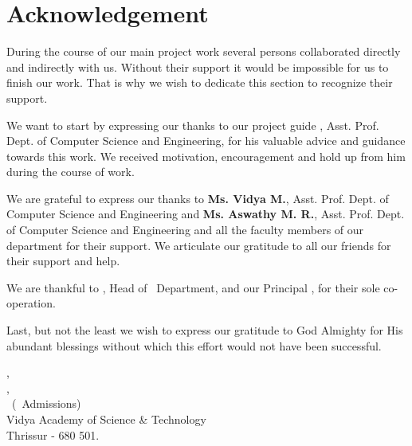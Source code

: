 %
%
%


%
\chapter*{\centering Acknowledgement}
%


\par
\hspace{0.9cm}During the course of our main project work several persons collaborated directly and indirectly with us. Without their support it would be impossible for us to finish our work. That is why we wish to dedicate this section to recognize their support.
\vspace {.2cm}
\par
\hspace{.35cm}We want to start by expressing our thanks to our project guide {\bf \vguide}, Asst. Prof. Dept. of Computer Science and Engineering, for his valuable advice and guidance towards this work. We received motivation, encouragement and hold up from him during the course of work.
\vspace{0.2cm}
\par
\hspace{0.35cm}We are grateful to express our thanks to  {\bf Ms. Vidya M.}, Asst. Prof. Dept. of Computer Science and Engineering and {\bf Ms. Aswathy M. R.}, Asst. Prof. Dept. of Computer Science and Engineering and all the faculty members of our  department for their support. We articulate our gratitude to all our friends  for their support and help.

\vspace{.2cm}
\par 
\hspace{.35cm}We are thankful to {\bf \vhod}, 
Head of \vdept\  Department, and our Principal {\bf \vprincipal}, for their sole co-operation.




\vspace{0.2cm}
\par
\hspace{0.35cm}Last, but not the least we wish to express our gratitude to God Almighty for His abundant blessings without which this effort would not have been successful.\\[.3 cm]



\begin{flushright}
{\vauthora , \vauthorb }\\{ \vauthorc , \vauthord  }\\

\vclass\  (\vadmissionyear\  Admissions)\\
Vidya Academy of Science \& Technology\\
\vdate  \hfill Thrissur - 680 501.
\end{flushright}